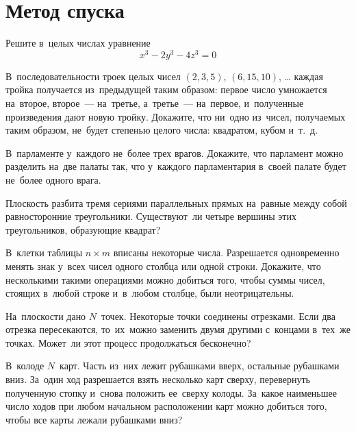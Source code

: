 
\section*{Метод спуска}


\begin{problems}

\item
Решите в~целых числах уравнение
\begin{equation*}
    x^3 - 2 y^3 - 4 z^3 = 0
\end{equation*}

\item
В~последовательности троек целых чисел $(2, 3, 5)$, $(6, 15, 10)$, \ldots
каждая тройка получается из~предыдущей таким образом: первое число умножается
на~второе, второе~--- на~третье, а~третье~--- на~первое, и~полученные
произведения дают новую тройку.
Докажите, что ни~одно из~чисел, получаемых таким образом, не~будет степенью
целого числа: квадратом, кубом и~т.~д.

\item
В~парламенте у~каждого не~более трех врагов.
Докажите, что парламент можно разделить на~две палаты так, что у~каждого
парламентария в~своей палате будет не~более одного врага.

\item
Плоскость разбита тремя сериями параллельных прямых на~равные между собой
равносторонние треугольники.
Существуют~ли четыре вершины этих треугольников, образующие квадрат?

\item
В~клетки таблицы $n \times m$ вписаны некоторые числа.
Разрешается одновременно менять знак у~всех чисел одного столбца или одной
строки.
Докажите, что несколькими такими операциями можно добиться того, чтобы суммы
чисел, стоящих в~любой строке и~в~любом столбце, были неотрицательны.

\item
На~плоскости дано $N$~точек.
Некоторые точки соединены отрезками.
Если два отрезка пересекаются, то~их~можно заменить двумя другими с~концами
в~тех~же точках.
Может~ли этот процесс продолжаться бесконечно?

\item
В~колоде $N$~карт.
Часть из~них лежит рубашками вверх, остальные рубашками вниз.
За~один ход разрешается взять несколько карт сверху, перевернуть полученную
стопку и~снова положить ее~сверху колоды.
За~какое наименьшее число ходов при любом начальном расположении карт можно
добиться того, чтобы все карты лежали рубашками вниз?


\end{problems}
